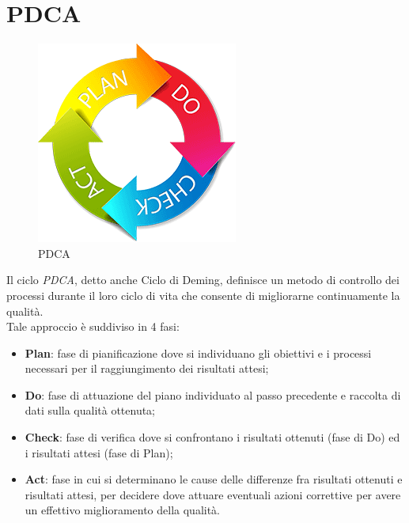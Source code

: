 \newpage
\section{PDCA}

\label{PDCA}
\begin{figure}[h]
\centering
\includegraphics[scale=0.5,keepaspectratio]{PDCA.png}
\caption{PDCA}
\end{figure}
\FloatBarrier

Il ciclo \textit{PDCA}, detto anche Ciclo di Deming, definisce un metodo di controllo dei processi durante il loro ciclo di vita che consente di migliorarne continuamente la qualità. \\ 
Tale approccio è suddiviso in 4 fasi:
\begin{itemize}
\item \textbf{Plan}: fase di pianificazione dove si individuano gli obiettivi e i processi necessari per il raggiungimento dei risultati attesi;
\item \textbf{Do}: fase di attuazione del piano individuato al passo precedente e raccolta di dati sulla qualità ottenuta;
\item \textbf{Check}: fase di verifica dove si confrontano i risultati ottenuti (fase di Do) ed i risultati attesi (fase di Plan);
\item \textbf{Act}: fase in cui si determinano le cause delle differenze fra risultati ottenuti e risultati attesi, per decidere dove attuare eventuali azioni correttive per avere un effettivo miglioramento della qualità.
\end{itemize}